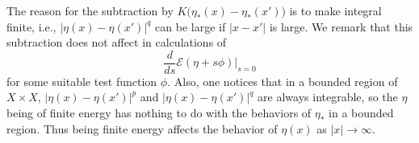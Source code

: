 \documentclass[10pt, letterpaper]{article}
\def\blue{\color{blue}}
\def\Orb{{\textsf{Orbit}}\,}
\def\S{{\textsf{S}}}
\def\E{{\mathcal{E}}}
\theoremstyle{definition}
\theoremstyle{remark}
\begin{document}
The reason for the subtraction by $K\big(\eta_*(x) - \eta_*(x'))$ is to make integral finite, i.e., $|\eta(x)-\eta(x')|^q$ can be large if $|x-x'|$ is large. We remark that this subtraction does not affect in calculations of 
$$ \frac{d}{ds} \E(\eta +s\phi) \Big|_{s=0}$$
for some suitable test function $\phi$. Also, one notices that in a bounded region of $X \times X$,
$|\eta(x) - \eta(x')|^p$ and $|\eta(x) - \eta(x')|^q$ are always integrable, so the $\eta$ being of finite energy has nothing to do with the behaviors of $\eta_*$ in a bounded region. Thus being finite energy affects the behavior of $\eta(x)$ as $|x| \rightarrow \infty$. 

% 
% 
% 
% 
% 
% 
% 
\end{document}
